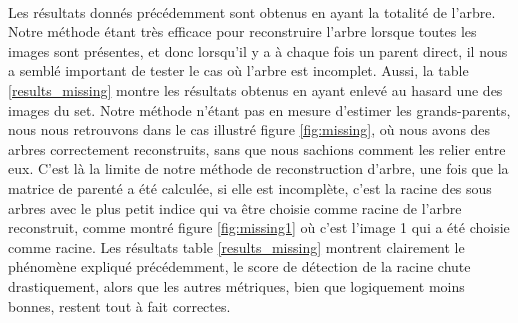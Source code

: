 \documentclass[utf8,final]{stageM2R} %
\begin{document}
\paragraph{}

Les résultats donnés précédemment sont obtenus en ayant la totalité de l'arbre. Notre méthode étant très efficace pour reconstruire l'arbre lorsque toutes les images sont présentes, et donc lorsqu'il y a à chaque fois un parent direct, il nous a semblé important de tester le cas où l'arbre est incomplet. Aussi, la table \ref{results_missing} montre les résultats obtenus en ayant enlevé au hasard une des images du set. Notre méthode n'étant pas en mesure d'estimer les grands-parents, nous nous retrouvons dans le cas illustré figure \ref{fig:missing}, où nous avons des arbres correctement reconstruits, sans que nous sachions comment les relier entre eux. C'est là la limite de notre méthode de reconstruction d'arbre, une fois que la matrice de parenté a été calculée, si elle est incomplète, c'est la racine des sous arbres avec le plus petit indice qui va être choisie comme racine de l'arbre reconstruit, comme montré figure \ref{fig:missing1} où c'est l'image 1 qui a été choisie comme racine. Les résultats table \ref{results_missing} montrent clairement le phénomène expliqué précédemment, le score de détection de la racine chute drastiquement, alors que les autres métriques, bien que logiquement moins bonnes, restent tout à fait correctes.
\end{document}
